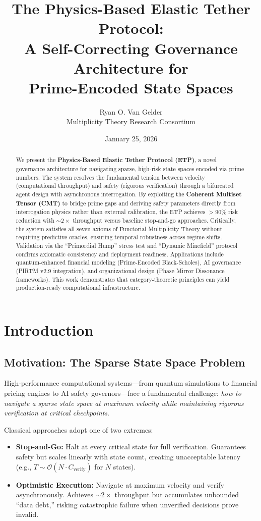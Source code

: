 \documentclass[12pt,a4paper]{article}
\title{\textbf{The Physics-Based Elastic Tether Protocol:} \\ 
A Self-Correcting Governance Architecture for \\
Prime-Encoded State Spaces}
\author{
Ryan O. Van Gelder \\
Multiplicity Theory Research Consortium
}
\date{January 25, 2026}
\begin{document}
\maketitle

\begin{abstract}
We present the \textbf{Physics-Based Elastic Tether Protocol (ETP)}, a novel governance architecture for navigating sparse, high-risk state spaces encoded via prime numbers. The system resolves the fundamental tension between velocity (computational throughput) and safety (rigorous verification) through a bifurcated agent design with asynchronous interrogation. By exploiting the \textbf{Coherent Multiset Tensor (CMT)} to bridge prime gaps and deriving safety parameters directly from interrogation physics rather than external calibration, the ETP achieves $>90\%$ risk reduction with $\sim 2\times$ throughput versus baseline stop-and-go approaches. Critically, the system satisfies all seven axioms of Functorial Multiplicity Theory without requiring predictive oracles, ensuring temporal robustness across regime shifts. Validation via the ``Primordial Hump'' stress test and ``Dynamic Minefield'' protocol confirms axiomatic consistency and deployment readiness. Applications include quantum-enhanced financial modeling (Prime-Encoded Black-Scholes), AI governance (PIRTM v2.9 integration), and organizational design (Phase Mirror Dissonance frameworks). This work demonstrates that category-theoretic principles can yield production-ready computational infrastructure.
\end{abstract}

\section{Introduction}

\subsection{Motivation: The Sparse State Space Problem}

High-performance computational systems—from quantum simulations to financial pricing engines to AI safety governors—face a fundamental challenge: \textit{how to navigate a sparse state space at maximum velocity while maintaining rigorous verification at critical checkpoints}.

Classical approaches adopt one of two extremes:

\begin{itemize}
\item \textbf{Stop-and-Go:} Halt at every critical state for full verification. Guarantees safety but scales linearly with state count, creating unacceptable latency (e.g., $T \sim \mathcal{O}(N \cdot C_{\text{verify}})$ for $N$ states).

\item \textbf{Optimistic Execution:} Navigate at maximum velocity and verify asynchronously. Achieves $\sim 2\times$ throughput but accumulates unbounded ``data debt,'' risking catastrophic failure when unverified decisions prove invalid.
\end{itemize}
\end{document}
